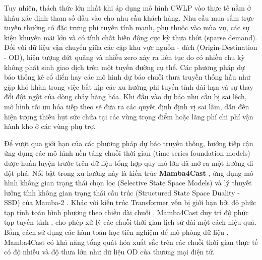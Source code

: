 Tuy nhiên, thách thức lớn nhất khi áp dụng mô hình CWLP vào thực tế nằm ở khâu xác định tham số đầu vào cho nhu cầu khách hàng. Nhu cầu mua sắm trực tuyến thường có đặc trưng phi tuyến tính mạnh, phụ thuộc vào mùa vụ, các sự kiện khuyến mãi lớn và có tính chất biến động cực kỳ thưa thớt (sparse demand). Đối với dữ liệu vận chuyển giữa các cặp khu vực nguồn - đích (Origin-Destination - OD), hiện tượng đứt quãng và nhiễu zero xảy ra liên tục do có nhiều chu kỳ không phát sinh giao dịch trên một tuyến đường cụ thể. Các phương pháp dự báo thống kê cổ điển hay các mô hình dự báo chuỗi thưa truyền thống \cite{croston1972} hầu như gặp khó khăn trong việc bắt kịp các xu hướng phi tuyến tính dài hạn và sự thay đổi đột ngột của dòng chảy hàng hóa. Khi đầu vào dự báo nhu cầu bị sai lệch, mô hình tối ưu hóa tiếp theo sẽ đưa ra các quyết định định vị sai lầm, dẫn đến hiện tượng thiếu hụt sức chứa tại các vùng trọng điểm hoặc lãng phí chi phí vận hành kho ở các vùng phụ trợ.

Để vượt qua giới hạn của các phương pháp dự báo truyền thống, hướng tiếp cận ứng dụng các mô hình nền tảng chuỗi thời gian (time series foundation models) được huấn luyện trước trên dữ liệu tổng hợp quy mô lớn đã mở ra một hướng đi đột phá. Nổi bật trong xu hướng này là kiến trúc \textbf{Mamba4Cast} \cite{bhethanabhotla2024}, ứng dụng mô hình không gian trạng thái chọn lọc (Selective State Space Models) và lý thuyết lưỡng tính không gian trạng thái cấu trúc (Structured State Space Duality - SSD) của Mamba-2 \cite{dao2024}. Khác với kiến trúc Transformer vốn bị giới hạn bởi độ phức tạp tính toán bình phương theo chiều dài chuỗi \cite{nie2023, zhou2021}, Mamba4Cast duy trì độ phức tạp tuyến tính \cite{gu2024mamba}, cho phép xử lý các chuỗi thời gian lịch sử dài một cách hiệu quả. Bằng cách sử dụng các hàm toán học tiên nghiệm để mô phỏng dữ liệu \cite{dooley2023}, Mamba4Cast có khả năng tổng quát hóa xuất sắc trên các chuỗi thời gian thực tế có độ nhiễu và độ thưa lớn như dữ liệu OD của thương mại điện tử.

